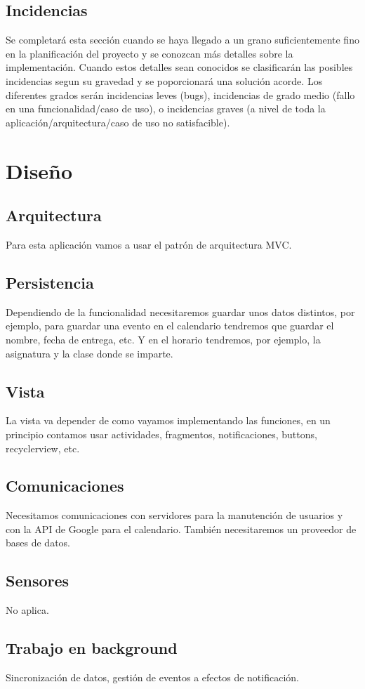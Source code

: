 \documentclass[a4paper,openright,12pt]{article}
\begin{document}
\subsection{Incidencias}
Se completará esta sección cuando se haya llegado a un grano suficientemente fino en la planificación del proyecto y se conozcan más detalles sobre la implementación.
Cuando estos detalles sean conocidos se clasificarán las posibles incidencias segun su gravedad y se poporcionará una solución acorde. Los diferentes grados serán incidencias leves (bugs), incidencias de grado medio (fallo en una funcionalidad/caso de uso), o incidencias graves (a nivel de toda la aplicación/arquitectura/caso de uso no satisfacible).

\section{Diseño}

\subsection{Arquitectura}
Para esta aplicación vamos a usar el patrón de arquitectura MVC.

\subsection{Persistencia}
Dependiendo de la funcionalidad necesitaremos guardar unos datos distintos, por ejemplo, para guardar una evento en el calendario tendremos que guardar el nombre, fecha de entrega, etc. Y en el horario tendremos, por ejemplo, la asignatura y la clase donde se imparte.
\subsection{Vista}
La vista va depender de como vayamos implementando las funciones, en un principio contamos usar actividades, fragmentos, notificaciones, buttons, recyclerview, etc.
\subsection{Comunicaciones}
Necesitamos comunicaciones con servidores para la manutención de usuarios y con la API de Google para el calendario. También necesitaremos un proveedor de bases de datos.
\subsection{Sensores}
No aplica.
\subsection{Trabajo en background}
Sincronización de datos, gestión de eventos a efectos de notificación.










\end{document}
